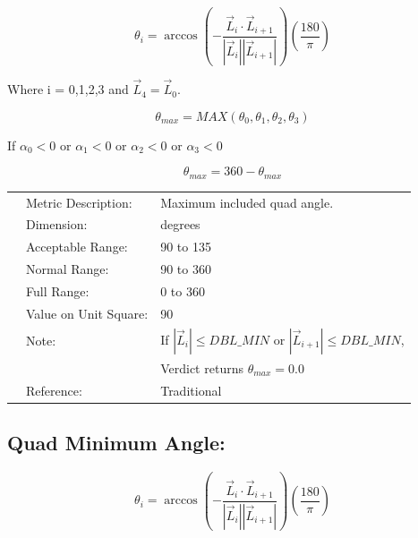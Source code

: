 \documentclass[12pt]{article}
\begin{document}
\begin{displaymath}
\theta_i = \arccos{ \left( - \frac {\vec L_{i} \cdot \vec L_{i+1} }
                                {| \vec L_{i} | | \vec L_{i+1} |} \right) } 
                                  \left( \frac {180} {\pi} \right) 
\end{displaymath}

Where i = 0,1,2,3 and $\vec L_4 = \vec L_0$.

\begin{displaymath}
\theta_{max} = MAX\left( \theta_0, \theta_1, \theta_2, \theta_3 \right) 
\end{displaymath}

If $\alpha_0 < 0$ or $\alpha_1 < 0$ or $\alpha_2 < 0$ or $\alpha_3 < 0$

\begin{displaymath}
\theta_{max} = 360 - \theta_{max} 
\end{displaymath}


\begin{tabular}{lll}
& Metric Description:  & Maximum included quad angle.  \\
& Dimension:           & degrees                   \\ 
& Acceptable Range:    & 90 to 135 \\ 
& Normal Range:        & 90 to 360 \\ 
& Full Range:          & 0 to 360 \\ 
& Value on Unit Square:& 90 \\
& Note:                & If $|\vec L_i| \leq DBL\_MIN$ or $|\vec L_{i+1}| \leq DBL\_MIN$, \\
&                      & Verdict returns $\theta_{max} = 0.0$\\ 
& Reference:           & Traditional \\
\end{tabular} 

\subsection*{Quad Minimum Angle:}

\begin{displaymath}
\theta_i = \arccos{ \left( - \frac {\vec L_{i} \cdot \vec L_{i+1} }
                                {| \vec L_{i} | | \vec L_{i+1} |} \right) } 
                                  \left( \frac {180} {\pi} \right) 
\end{displaymath}
\end{document}
